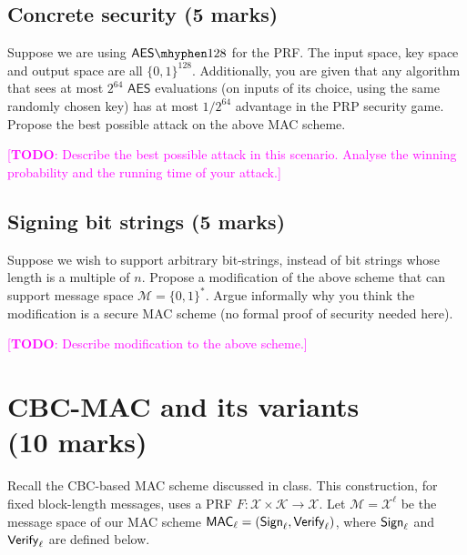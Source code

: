 \documentclass[10pt,addpoints]{exam}
\newcommand{\calK}{\mathcal{K}}
\newcommand{\calM}{\mathcal{M}}
\newcommand{\calX}{\mathcal{X}}
\newcommand{\TODO}[1]{\textcolor{magenta}{[\textbf{TODO}: #1]}}
\newcommand{\bit}{\{0,1\}}
\newcommand{\AES}{\mathsf{AES}}
\theoremstyle{definition}
\begin{document}
    \color{blue}
    \subsection{Concrete security (5 marks)}
    {
        Suppose we are using $\AES\mhyphen 128$ for the PRF. The input space, key space and output space are all $\bit^{128}$. Additionally, you are given that any algorithm that sees at most $2^{64}$ $\AES$ evaluations (on inputs of its choice, using the same randomly chosen key) has at most $1/2^{64}$ advantage in the PRP security game. Propose the best possible attack on the above MAC scheme. 
    }

    \vspace{10pt}
    \TODO{Describe the best possible attack in this scenario. Analyse the winning probability and the running time of your attack.}




    \color{blue}
    \subsection{Signing bit strings (5 marks)} 

    {
        Suppose we wish to support arbitrary bit-strings, instead of bit strings whose length is a multiple of $n$. Propose a modification of the above scheme that can support message space $\calM = \bit^*$. Argue informally why you think the modification is a secure MAC scheme (no formal proof of security needed here). 
    }


    \vspace{10pt}

    \TODO{Describe modification to the above scheme.}

















\newpage
\color{blue}

\section{CBC-MAC and its variants \\ (10 marks)}

    Recall the CBC-based MAC scheme discussed in class. This construction, for fixed block-length messages, uses a PRF $F:\calX \times \calK \to \calX$. Let $\calM = \calX^\ell$ be the message space of our MAC scheme $\mathsf{MAC}_{\ell} = (\mathsf{Sign}_{\ell}, \mathsf{Verify}_{\ell})$, where $\mathsf{Sign}_{\ell}$ and $\mathsf{Verify}_{\ell}$ are defined below. 
\end{document}
